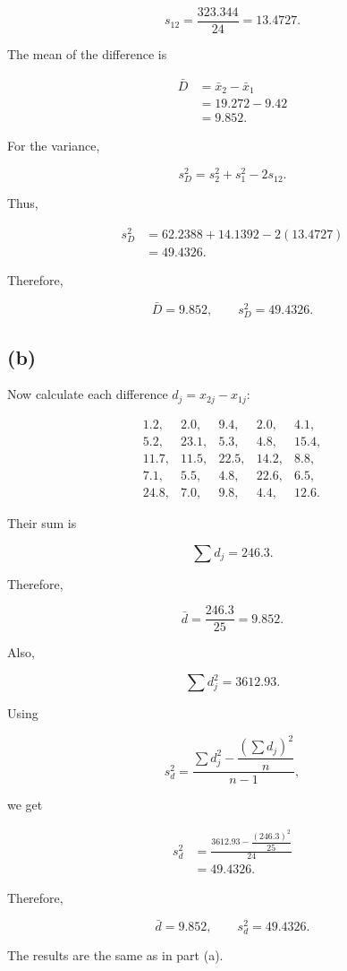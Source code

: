 \documentclass[12pt]{article}
\begin{document}
$$
s_{12}
=
\frac{323.344}{24}
=
\boxed{13.4727}.
$$

The mean of the difference is

$$
\begin{aligned}
\bar{D}
&=\bar{x}_2-\bar{x}_1\\
&=19.272-9.42\\
&=\boxed{9.852}.
\end{aligned}
$$

For the variance,

$$
s_D^2
=
s_2^2+s_1^2-2s_{12}.
$$

Thus,

$$
\begin{aligned}
s_D^2
&=62.2388+14.1392-2(13.4727)\\
&=\boxed{49.4326}.
\end{aligned}
$$

Therefore,

$$
\boxed{\bar{D}=9.852,\qquad s_D^2=49.4326}.
$$

\subsection*{(b)}

Now calculate each difference $d_j=x_{2j}-x_{1j}$:

$$
\begin{array}{rrrrr}
1.2,&2.0,&9.4,&2.0,&4.1,\\
5.2,&23.1,&5.3,&4.8,&15.4,\\
11.7,&11.5,&22.5,&14.2,&8.8,\\
7.1,&5.5,&4.8,&22.6,&6.5,\\
24.8,&7.0,&9.8,&4.4,&12.6.
\end{array}
$$

Their sum is

$$
\sum d_j=246.3.
$$

Therefore,

$$
\bar{d}
=
\frac{246.3}{25}
=
\boxed{9.852}.
$$

Also,

$$
\sum d_j^2=3612.93.
$$

Using

$$
s_d^2
=
\frac{
\sum d_j^2-\dfrac{(\sum d_j)^2}{n}
}{n-1},
$$

we get

$$
\begin{aligned}
s_d^2
&=
\frac{
3612.93-\dfrac{(246.3)^2}{25}
}{24}\\
&=\boxed{49.4326}.
\end{aligned}
$$

Therefore,

$$
\boxed{\bar{d}=9.852,\qquad s_d^2=49.4326}.
$$

The results are the same as in part (a).
\end{document}
